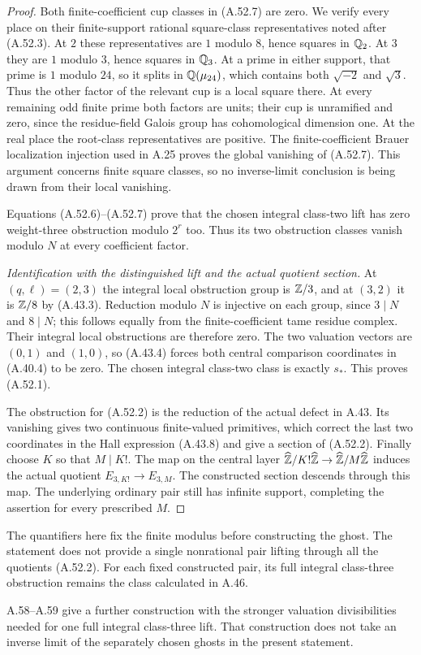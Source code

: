 \begin{proof}
Both finite-coefficient cup classes in (A.52.7) are zero.
We verify every place on their finite-support rational
square-class representatives noted after (A.52.3).
At $2$ these representatives are $1$ modulo $8$, hence
squares in $\mathbb Q_2$.  At $3$ they are $1$ modulo $3$, hence
squares in $\mathbb Q_3$.  At a prime in either support, that prime
is $1$ modulo $24$, so it splits in $\mathbb Q(\mu_{24})$, which
contains both $\sqrt{-2}$ and $\sqrt3$.  Thus the other
factor of the relevant cup is a local square there.
At every remaining odd finite prime both factors are units;
their cup is unramified and zero, since the residue-field
Galois group has cohomological dimension one.  At the real
place the root-class representatives are positive.  The
finite-coefficient Brauer localization injection used in A.25 proves
the global vanishing of (A.52.7).  This argument concerns
finite square classes, so no inverse-limit conclusion is
being drawn from their local vanishing.

Equations (A.52.6)--(A.52.7) prove that the chosen integral
class-two lift has zero weight-three obstruction modulo
$2^r$ too.  Thus its two obstruction classes vanish modulo
$N$ at every coefficient factor.

\emph{Identification with the distinguished lift and the actual
quotient section.}
At $(q,\ell)=(2,3)$ the integral local obstruction group is
$\mathbb Z/3$, and at $(3,2)$ it is $\mathbb Z/8$ by (A.43.3).
Reduction modulo $N$ is injective on each group, since
$3\mid N$ and $8\mid N$; this follows equally from the
finite-coefficient tame residue complex.  Their integral
local obstructions are therefore zero.  The two valuation
vectors are $(0,1)$ and $(1,0)$, so (A.43.4) forces both
central comparison coordinates in (A.40.4) to be zero.
The chosen integral class-two class is exactly $s_*$.
This proves (A.52.1).

The obstruction for (A.52.2) is the reduction of the actual
defect in A.43.  Its vanishing gives two continuous finite-valued
primitives, which correct the last two coordinates in the
Hall expression (A.43.8) and give a section of (A.52.2).
Finally choose $K$ so that $M\mid K!$.  The map on the
central layer $\widehat{\mathbb Z}/K!\widehat{\mathbb Z}\to
\widehat{\mathbb Z}/M\widehat{\mathbb Z}$ induces the actual quotient
$E_{3,K!}\to E_{3,M}$.  The constructed section descends
through this map.  The underlying ordinary pair still has
infinite support, completing the assertion for every
prescribed $M$.
\end{proof}

The quantifiers here fix the finite modulus before constructing
the ghost.  The statement does not provide a single nonrational
pair lifting through all the quotients (A.52.2).  For each fixed
constructed pair, its full integral class-three obstruction
remains the class calculated in A.46.

A.58--A.59 give a further construction with the stronger
valuation divisibilities needed for one full integral
class-three lift. That construction does not take an inverse
limit of the separately chosen ghosts in the present statement.
